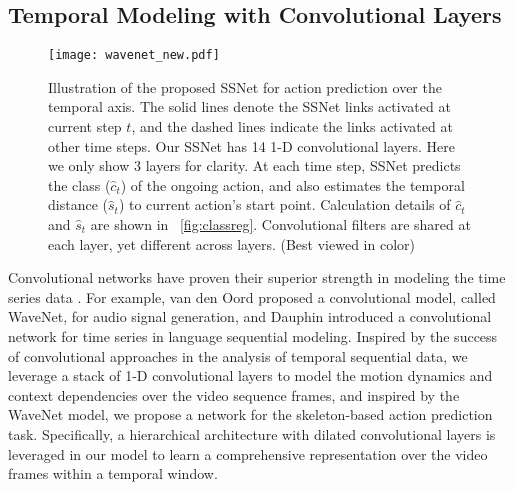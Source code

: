\documentclass[10pt,twocolumn,letterpaper]{article}
\begin{document}
\subsection{Temporal Modeling with Convolutional Layers}
\label{sec:method:dilatedCNN}

\begin{figure}[tp]
	\centerline{\texttt{[image: wavenet\_new.pdf]}}
	\caption{
Illustration of the proposed SSNet for action prediction over the temporal axis.
The solid lines denote the SSNet links activated at current step $t$,
and the dashed lines indicate the links activated at other time steps.
Our SSNet has 14 1-D convolutional layers.
Here we only show 3 layers for clarity.
At each time step, SSNet predicts the class ($\hat{c}_t$) of the ongoing action,
and also estimates the temporal distance ($\hat{s}_t$) to current action's start point.
Calculation details of $\hat{c}_t$ and $\hat{s}_t$ are shown in \figurename{~\ref{fig:classreg}}.
Convolutional filters are shared at each layer, yet different across layers.
(Best viewed in color)
}
	\label{fig:wavenet}
\end{figure}






Convolutional networks \cite{lecun1995convolutional} have proven their superior strength in modeling the time series data \cite{van2016wavenet,dauphin2016language,varol2017long}.
For example, van den Oord \etal \cite{van2016wavenet} proposed a convolutional model, called WaveNet, for audio signal generation, and
Dauphin \etal \cite{dauphin2016language} introduced a convolutional network for time series in language sequential modeling. Inspired by the success of convolutional approaches in the analysis of temporal sequential data,
we leverage a stack of 1-D convolutional layers to model the motion dynamics and context dependencies over the video sequence frames,
and inspired by the WaveNet model, we propose a network for the skeleton-based action prediction task.
Specifically, a hierarchical architecture with dilated convolutional layers is leveraged in our model
to learn a comprehensive representation over the video frames within a temporal window. 
\end{document}
